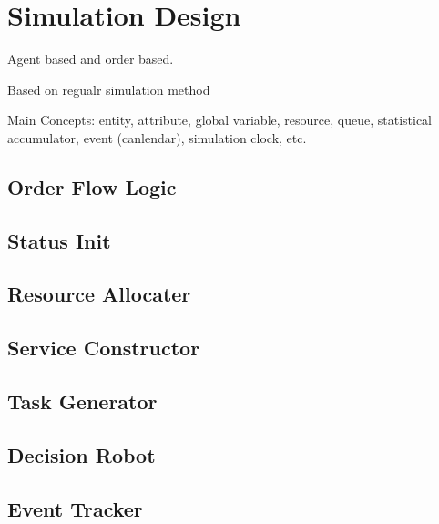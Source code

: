 \section{Simulation Design}
Agent based and order based.

Based on regualr simulation method 

Main Concepts:
entity,
attribute,
global variable,
resource,
queue,
statistical accumulator,
event (canlendar),
simulation clock, etc.

\subsection{Order Flow Logic} %
\label{sub:order_flow_logic}


\subsection{Status Init} %
\label{sub:status_init}


\subsection{Resource Allocater} %
\label{sub:resource_allocation}


\subsection{Service Constructor} %
\label{sub:service_constructor}


\subsection{Task Generator} %
\label{sub:task_generator}


\subsection{Decision Robot} %
\label{sub:decision_robot}


\subsection{Event Tracker} %
\label{sub:event_tracker}


